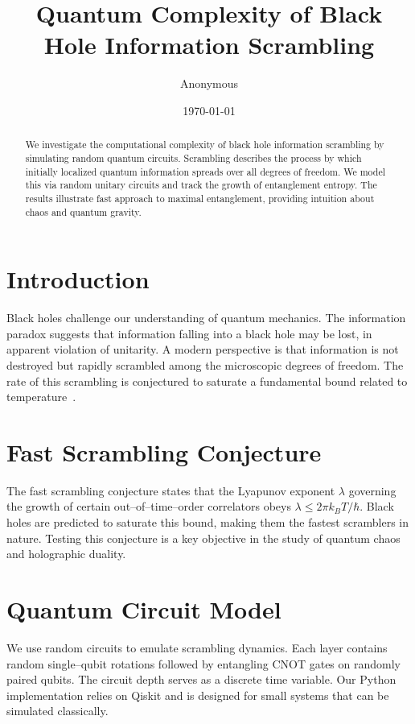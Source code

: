 \documentclass{article}
\title{Quantum Complexity of Black Hole Information Scrambling}
\author{Anonymous}
\date{\today}
\begin{document}
\maketitle
\begin{abstract}
We investigate the computational complexity of black hole information scrambling by simulating random quantum circuits. Scrambling describes the process by which initially localized quantum information spreads over all degrees of freedom. We model this via random unitary circuits and track the growth of entanglement entropy. The results illustrate fast approach to maximal entanglement, providing intuition about chaos and quantum gravity.
\end{abstract}

\section{Introduction}
Black holes challenge our understanding of quantum mechanics. The information paradox suggests that information falling into a black hole may be lost, in apparent violation of unitarity. A modern perspective is that information is not destroyed but rapidly scrambled among the microscopic degrees of freedom. The rate of this scrambling is conjectured to saturate a fundamental bound related to temperature~\cite{HaydenPreskill, SekinoSusskind}.

\section{Fast Scrambling Conjecture}
The fast scrambling conjecture states that the Lyapunov exponent $\lambda$ governing the growth of certain out--of--time--order correlators obeys $\lambda \le 2\pi k_B T/\hbar$. Black holes are predicted to saturate this bound, making them the fastest scramblers in nature. Testing this conjecture is a key objective in the study of quantum chaos and holographic duality.

\section{Quantum Circuit Model}
We use random circuits to emulate scrambling dynamics. Each layer contains random single--qubit rotations followed by entangling CNOT gates on randomly paired qubits. The circuit depth serves as a discrete time variable. Our Python implementation relies on Qiskit and is designed for small systems that can be simulated classically.
\end{document}
